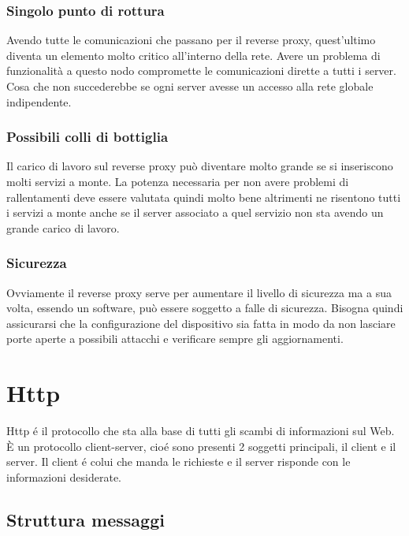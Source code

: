 \subsubsection{Singolo punto di rottura}
Avendo tutte le comunicazioni che passano per il reverse proxy, quest'ultimo diventa un elemento molto critico all'interno della rete. Avere un problema di funzionalità a questo nodo compromette le comunicazioni dirette a tutti i server. Cosa che non succederebbe se ogni server avesse un accesso alla rete globale indipendente.
\subsubsection{Possibili colli di bottiglia}
Il carico di lavoro sul reverse proxy può diventare molto grande se si inseriscono molti servizi a monte. La potenza necessaria per non avere problemi di rallentamenti deve essere valutata quindi molto bene altrimenti ne risentono tutti i servizi a monte anche se il server associato a quel servizio non sta avendo un grande carico di lavoro.
\subsubsection{Sicurezza}
Ovviamente il reverse proxy serve per aumentare il livello di sicurezza ma a sua volta, essendo un software, può essere soggetto a falle di sicurezza. Bisogna quindi assicurarsi che la configurazione del dispositivo sia fatta in modo da non lasciare porte aperte a possibili attacchi e verificare sempre gli aggiornamenti.


\section{Http}
\cite{http}
Http é il protocollo che sta alla base di tutti gli scambi di informazioni sul Web. È un protocollo client-server, cioé sono presenti 2 soggetti principali, il client e il server. Il client é colui che manda le richieste e il server risponde con le informazioni desiderate.
\subsection{Struttura messaggi}
